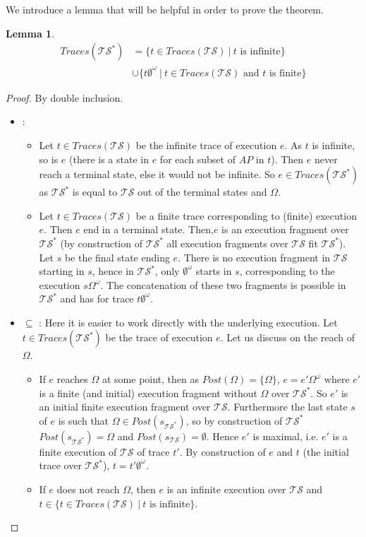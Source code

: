 \documentclass[11pt,a4paper]{article}
\def\ts{\mathcal{TS}}
\def\tss{\mathcal{TS^*}}
\def\traces{\mathit{Traces}}
\newtheorem*{lemma}{Lemma}
\begin{document}
\begin{Answer}[number=2]
\Question%
We introduce a lemma that will be helpful in order to prove the theorem.
\begin{lemma}
  \begin{align*}
    \traces(\tss) &= \{t\in\traces(\ts)~|~t\text{ is infinite}\}\\
    &\cup\{t\emptyset^\omega~|~t\in\traces(\ts)\text{ and $t$ is finite}\}
  \end{align*}
\end{lemma}
\begin{proof}
  By double inclusion.\\
  \begin{itemize}
  \item {} : %
  \begin{itemize}
  \item Let $t\in \traces(\ts)$ be the infinite trace of execution $e$. As $t$ is infinite, so is $e$ (there is a state in $e$ for each subset of $AP$ in $t$). 
  Then $e$ never reach a terminal state, else it would not be infinite. So $e\in \traces(\tss)$ as $\tss$ is equal to $\ts$ out of the terminal states and $\Omega$.
  \item Let $t\in \traces(\ts)$ be a finite trace corresponding to (finite) execution $e$. Then $e$ end in a terminal state. Then,$e$ is an execution fragment over $\tss$ 
  (by construction of $\tss$ all execution fragments over $\ts$ fit $\tss$). Let $s$ be the final state ending $e$. There is no execution fragment in $\ts$ starting in $s$, 
  hence in $\tss$, only $\emptyset^\omega$ starts in $s$, corresponding to the execution $s\Omega^\omega$. The concatenation of these two fragments is possible in $\tss$ and has for trace $t\emptyset^\omega$.
  \end{itemize}
  \item $\subseteq$ : Here it is easier to work directly with the underlying execution. 
  Let $t\in \traces(\tss)$ be the trace of execution $e$. Let us discuss on the reach of $\Omega$.
  \begin{itemize}
  \item If $e$ reaches $\Omega$ at some point, then as $Post(\Omega) = \{\Omega\}$, $e=e'\Omega^\omega$ where $e'$ is a finite (and initial) execution fragment without $\Omega$ over $\tss$. 
  So $e'$ is an initial finite execution fragment over $\ts$. Furthermore the last state $s$ of $e$ is such that $\Omega \in Post(s_{\tss})$, so by construction of $\tss$ $Post(s_{\tss})=\Omega$ and 
  $Post(s_{\ts})=\emptyset$. Hence $e'$ is maximal, i.e. $e'$ is a finite execution of $\ts$ of trace $t'$. By construction of $e$ and $t$ (the initial trace over $\tss$), $t = t'\emptyset^\omega$.
  \item If $e$ does not reach $\Omega$, then $e$ is an infinite execution over $\ts$ and $t\in  \{t\in\traces(\ts)~|~t\text{ is infinite}\}$.
  \end{itemize}
  \end{itemize}
\end{proof}



\end{Answer}
\end{document}
